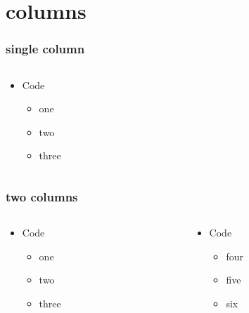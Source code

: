 \documentclass[bigger, presentation]{beamer}
\begin{document}
\section{columns}
\label{sec-6}
\begin{frame}
\frametitle{single column}
\label{sec-6-1}

   
\begin{columns}
\begin{column}{0.3\textwidth}
\begin{itemize}

\item Code
\label{sec-6-1-1}%
\begin{itemize}
\item one
\item two
\item three
\end{itemize}

\end{itemize} %
\end{column}
\end{columns}
\end{frame}
\begin{frame}
\frametitle{two columns}
\label{sec-6-2}
\begin{columns}
\begin{column}{0.3\textwidth}
\begin{itemize}

\item Code
\label{sec-6-2-1}%
\begin{itemize}
\item one
\item two
\item three
\end{itemize}


\end{itemize} %
\end{column}
\begin{column}{0.3\textwidth}
\begin{itemize}

\item Code
\label{sec-6-2-2}%
\begin{itemize}
\item four
\item five
\item six
\end{itemize}

\end{itemize} %
\end{column}
\end{columns}
\end{frame}
\end{document}

